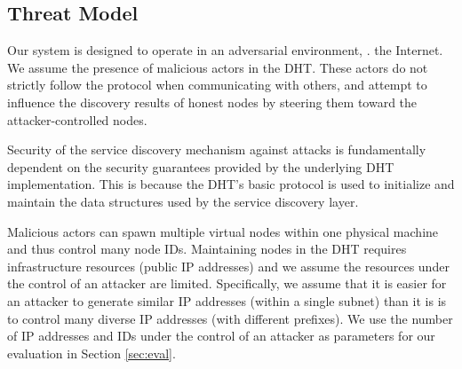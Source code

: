 \subsection{Threat Model}

Our system is designed to operate in an adversarial environment, \ie. the Internet. We assume the presence of malicious actors in the DHT. These actors do not strictly follow the protocol when communicating with others, and attempt to influence the discovery results of honest nodes by steering them toward the attacker-controlled nodes.

Security of the service discovery mechanism against attacks is fundamentally dependent on the security guarantees provided by the underlying DHT implementation. This is because the DHT's basic protocol is used to initialize and maintain the data structures used by the service discovery layer.


Malicious actors can spawn multiple virtual nodes within one physical machine and thus control many node IDs. Maintaining nodes in the DHT requires infrastructure resources (public IP addresses) and we assume the resources under the control of an attacker are limited. Specifically, we assume that it is easier for an attacker to generate similar IP addresses (within a single subnet) than it is is to control many diverse IP addresses (with different prefixes). We use the number of IP addresses and IDs under the control of an attacker as parameters for our evaluation in Section \ref{sec:eval}.


%
